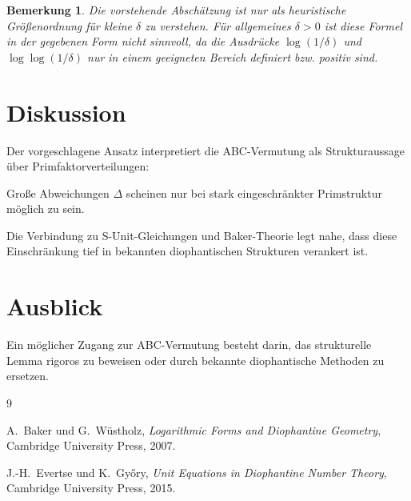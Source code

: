 \documentclass[11pt]{article}
\newtheorem{remark}{Bemerkung}
\begin{document}
	\begin{remark}
		Die vorstehende Abschätzung ist nur als heuristische Größenordnung
		für kleine $\delta$ zu verstehen. Für allgemeines $\delta>0$ ist
		diese Formel in der gegebenen Form nicht sinnvoll, da die Ausdrücke
		$\log(1/\delta)$ und $\log\log(1/\delta)$ nur in einem geeigneten
		Bereich definiert bzw. positiv sind.
	\end{remark}
	
	\section{Diskussion}
	
	Der vorgeschlagene Ansatz interpretiert die ABC-Vermutung als
	Strukturaussage über Primfaktorverteilungen:
	
	Große Abweichungen $\Delta$ scheinen nur bei stark eingeschränkter
	Primstruktur möglich zu sein.
	
	Die Verbindung zu S-Unit-Gleichungen und Baker-Theorie legt nahe,
	dass diese Einschränkung tief in bekannten diophantischen Strukturen
	verankert ist.
	
	\section{Ausblick}
	
	Ein möglicher Zugang zur ABC-Vermutung besteht darin,
	das strukturelle Lemma rigoros zu beweisen oder durch bekannte
	diophantische Methoden zu ersetzen.
	
	\begin{thebibliography}{9}
		
		A.~Baker und G.~Wüstholz,
		\textit{Logarithmic Forms and Diophantine Geometry},
		Cambridge University Press, 2007.
		
		J.-H.~Evertse und K.~Győry,
		\textit{Unit Equations in Diophantine Number Theory},
		Cambridge University Press, 2015.
		
	\end{thebibliography}
	
\end{document}
